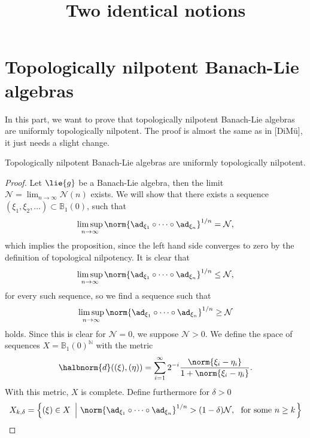\documentclass[
11pt,                          %
english                        %
]{article}
\title{Two identical notions}
\begin{document}
\section{Topologically nilpotent Banach-Lie algebras}

In this part, we want to prove that topologically nilpotent Banach-Lie algebras are 
uniformly topologically nilpotent. The proof is almost the same as in [DiM\"u], it 
just needs a slight change.
\begin{proposition}
	Topologically nilpotent Banach-Lie algebras are uniformly topologically 
	nilpotent.
\end{proposition}
\begin{proof}
	Let $\lie{g}$ be a Banach-Lie algebra, then the limit $\mathcal{N} = 
	\lim_{n \rightarrow \infty} \mathcal{N}(n)$ exists. We will show 
	that there exists a sequence $(\xi_1, \xi_2, \ldots) \subset \mathbb{B}_1(0)$, 
	such that
	\begin{equation*}
		\limsup_{n \rightarrow \infty}
		\norm{\ad_{\xi_1} \circ \cdots \circ \ad_{\xi_n} }^{1/n}
		=
		\mathcal{N},
	\end{equation*}
	which implies the proposition, since the left hand side converges to zero by 
	the definition of topological nilpotency. It is clear that
	\begin{equation*}
		\limsup_{n \rightarrow \infty}
		\norm{\ad_{\xi_1} \circ \cdots \circ \ad_{\xi_n} }^{1/n}
		\leq
		\mathcal{N},
	\end{equation*}
	for every such sequence, so we find a sequence such that
	\begin{equation*}
		\limsup_{n \rightarrow \infty}
		\norm{\ad_{\xi_1} \circ \cdots \circ \ad_{\xi_n} }^{1/n}
		\geq
		\mathcal{N}
	\end{equation*}
	holds. Since this is clear for $\mathcal{N} = 0$, we suppose $\mathcal{N} > 0$.
	We define the space of sequences $X = \mathbb{B}_1(0)^{\mathbb{N}}$ with the
	metric
	\begin{equation*}
		\halbnorm{d}((\xi), (\eta))
		=
		\sum\limits_{i = 1}^\infty
		2^{-i} \frac{\norm{\xi_i - \eta_i}}{1 + \norm{\xi_i - \eta_i}}.
	\end{equation*}
	With this metric, $X$ is complete. Define furthermore for $\delta > 0$
	\begin{align*}
		X_{k, \delta}
		&=
		\left\{
			(\xi) \in X
		\ \left| \
			\norm{ \ad_{\xi_1} \circ \cdots \circ \ad_{\xi_n} }^{1/n}
			>
			(1 - \delta) \mathcal{N}
			, \
			\text{ for some }
			n \geq k	
		\right.
		\right\}
		\\

\end{align*}
\end{proof}
\end{document}
